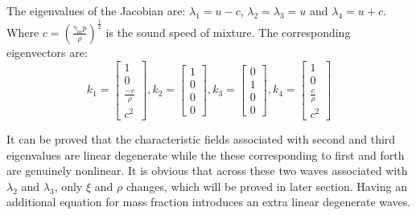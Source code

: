 The eigenvalues of the Jacobian are: $\lambda_1 = u-c$,  $\lambda_2 = \lambda_3 = u$ and $\lambda_4 = u+c$. Where $c=(\frac{\gamma_m p}{\rho})^{\frac{1}{2}}$ is the sound speed of mixture. The corresponding eigenvectors are: 
\begin{equation}
   k_1 =\begin{bmatrix}
         1 \\
         0 \\
         \frac{-c}{\rho} \\
         c^2
     \end{bmatrix},
   k_2 =\begin{bmatrix}
         1 \\
         0 \\
         0   \\
         0
     \end{bmatrix},
   k_3 =\begin{bmatrix}
         0 \\
         1 \\
         0   \\
         0
     \end{bmatrix},
   k_4 =\begin{bmatrix}
         1 \\
         0 \\
         \frac{c}{\rho} \\
         c^2
     \end{bmatrix}
     \label{eq:eigenvector-pressure}
\end{equation}

It can be proved that the characteristic fields associated with second and third eigenvalues are linear degenerate while the these corresponding to first and forth are genuinely nonlinear. It is obvious that across these two waves associated with $\lambda_2$ and $\lambda_3$, only $\xi$ and $\rho$ changes, which will be proved in later section. Having an additional equation for mass fraction introduces an extra linear degenerate waves.

